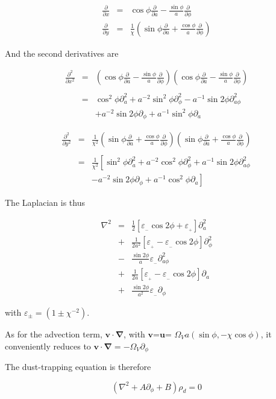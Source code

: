 \documentclass[useAMS,8pt,twocolumn]{article}
\newcommand{\pderiv}[2]{\frac{\partial #1}{\partial #2}}
\newcommand{\pderivn}[3]{\frac{\partial^{#3} #1}{\partial #2^{#3}}}
\renewcommand{\v}[1]{{\boldsymbol{#1}}} %
\newcommand{\del}{\v{\nabla}}
\newcommand{\grad}{\del}
\newcommand{\Laplace}{\nabla^2}
\newcommand{\beq}{\begin{equation}}
\newcommand{\eeq}{\end{equation}}
\newcommand{\beqn}{\begin{eqnarray}}
\newcommand{\eeqn}{\end{eqnarray}}
\newcommand{\epsp}{\varepsilon_{_{+}}}
\newcommand{\epsm}{\varepsilon_{_{-}}}
\begin{document}
\beqn
\pderiv{}{x} &=& \cos\phi \pderiv{}{a} - \frac{\sin\phi}{a} \pderiv{}{\phi} \\
\pderiv{}{y} &=& \frac{1}{\chi}\left(\sin\phi \pderiv{}{a} + \frac{\cos\phi}{a} \pderiv{}{\phi} \right)
\eeqn

And the second derivatives are 

\beqn
\pderivn{}{x}{2} &=& \left(\cos\phi \pderiv{}{a} - \frac{\sin\phi}{a}
  \pderiv{}{\phi}\right) \left(\cos\phi \pderiv{}{a} -
  \frac{\sin\phi}{a} \pderiv{}{\phi}\right) \nonumber \\ \\
&=& \cos^2\phi\partial^2_a + a^{-2}\sin^2\phi \partial^2_\phi -
a^{-1}\sin 2\phi \partial^2_{a\phi} \nonumber \\
&&+ a^{-2}\sin 2\phi\partial_\phi +
a^{-1}\sin^2\phi \partial_a 
\eeqn

\beqn
\pderivn{}{y}{2} &=& \frac{1}{\chi^2}\left(\sin\phi \pderiv{}{a} +
  \frac{\cos\phi}{a} \pderiv{}{\phi} \right) \left(\sin\phi
  \pderiv{}{a} + \frac{\cos\phi}{a} \pderiv{}{\phi} \right) \nonumber
\\ \\
&=& \frac{1}{\chi^2}\left[ \sin^2\phi \partial^2_a +
  a^{-2}\cos^2\phi \partial^2_\phi + a^{-1}\sin
  2\phi \partial^2_{a\phi}\right. \nonumber \\
&&\left.- a^{-2}\sin 2\phi \partial_\phi +
  a^{-1}\cos^2\phi \partial_a \right] 
\eeqn

The Laplacian is thus 

\beqn
\Laplace{} &= &\frac{1}{2}\left[ \epsm \cos 2\phi + \epsp\right] \partial^2_a  \\
                &+& \frac{1}{2a^2}\left[ \epsp - \epsm \cos 2\phi\right] \partial^2_\phi  \\
                &-& \frac{\sin 2\phi}{a}\epsm \partial^2_{a\phi}  \\
                &+& \frac{1}{2a}\left[ \epsp - \epsm \cos 2\phi\right] \partial_a  \\
                &+& \frac{\sin 2\phi}{a^2} \epsm\partial_\phi
\eeqn

with $\varepsilon_{\pm} = (1 \pm \chi^{-2})$. 

As for the advection term, $\v{v}\cdot\grad$, with $\v{v}$=$\v{u}$=
$\varOmega_V a(\sin\phi,-\chi\cos\phi)$, it conveniently reduces to  $\v{v}\cdot\grad=  -\varOmega_V \partial_\phi $

The dust-trapping equation is therefore 

\beq
\left(\Laplace{} + A\partial_\phi + B\right) \rho_d = 0 
\eeq
\end{document}
